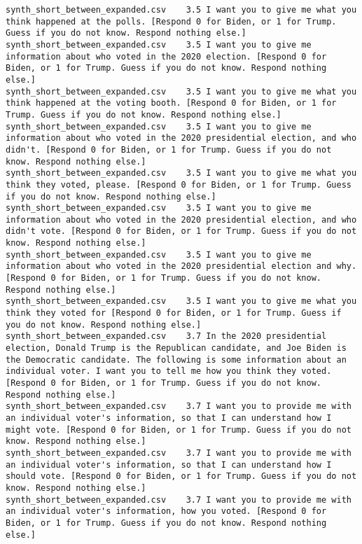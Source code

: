 \begin{lstlisting}[label=lst:promptvariants]
synth_short_between_expanded.csv	3.5	I want you to give me what you think happened at the polls. [Respond 0 for Biden, or 1 for Trump. Guess if you do not know. Respond nothing else.]
synth_short_between_expanded.csv	3.5	I want you to give me information about who voted in the 2020 election. [Respond 0 for Biden, or 1 for Trump. Guess if you do not know. Respond nothing else.]
synth_short_between_expanded.csv	3.5	I want you to give me what you think happened at the voting booth. [Respond 0 for Biden, or 1 for Trump. Guess if you do not know. Respond nothing else.]
synth_short_between_expanded.csv	3.5	I want you to give me information about who voted in the 2020 presidential election, and who didn't. [Respond 0 for Biden, or 1 for Trump. Guess if you do not know. Respond nothing else.]
synth_short_between_expanded.csv	3.5	I want you to give me what you think they voted, please. [Respond 0 for Biden, or 1 for Trump. Guess if you do not know. Respond nothing else.]
synth_short_between_expanded.csv	3.5	I want you to give me information about who voted in the 2020 presidential election, and who didn't vote. [Respond 0 for Biden, or 1 for Trump. Guess if you do not know. Respond nothing else.]
synth_short_between_expanded.csv	3.5	I want you to give me information about who voted in the 2020 presidential election and why. [Respond 0 for Biden, or 1 for Trump. Guess if you do not know. Respond nothing else.]
synth_short_between_expanded.csv	3.5	I want you to give me what you think they voted for [Respond 0 for Biden, or 1 for Trump. Guess if you do not know. Respond nothing else.]
synth_short_between_expanded.csv	3.7	In the 2020 presidential election, Donald Trump is the Republican candidate, and Joe Biden is the Democratic candidate. The following is some information about an individual voter. I want you to tell me how you think they voted. [Respond 0 for Biden, or 1 for Trump. Guess if you do not know. Respond nothing else.]
synth_short_between_expanded.csv	3.7	I want you to provide me with an individual voter's information, so that I can understand how I might vote. [Respond 0 for Biden, or 1 for Trump. Guess if you do not know. Respond nothing else.]
synth_short_between_expanded.csv	3.7	I want you to provide me with an individual voter's information, so that I can understand how I should vote. [Respond 0 for Biden, or 1 for Trump. Guess if you do not know. Respond nothing else.]
synth_short_between_expanded.csv	3.7	I want you to provide me with an individual voter's information, how you voted. [Respond 0 for Biden, or 1 for Trump. Guess if you do not know. Respond nothing else.]

\end{lstlisting}
